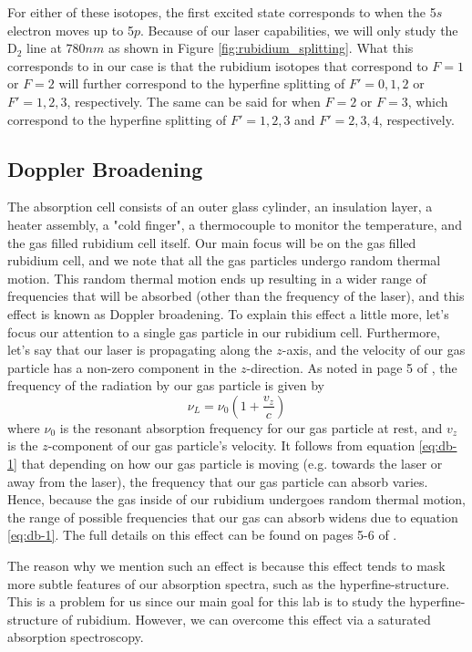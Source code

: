 \documentclass[twocolumn,amsmath,amssymb,pra, floatfix]{revtex4-2}
\begin{document}
For either of these isotopes, the first excited state corresponds to when the 5$s$ electron moves up to 5$p$. Because of our laser capabilities, we will only study the $\mathrm{D}_{2}$ line at $780 \si{nm}$ as shown in Figure \ref{fig:rubidium_splitting}. What this corresponds to in our case is that the rubidium isotopes that correspond to $F = 1$ or $F = 2$ will further correspond to the hyperfine splitting of $F' = 0, 1, 2$ or $F' = 1, 2, 3$, respectively. The same can be said for when $F = 2$ or $F = 3$, which correspond to the hyperfine splitting of $F' = 1, 2, 3$ and $F' = 2, 3, 4$, respectively.

\subsection{Doppler Broadening}
The absorption cell consists of an outer glass cylinder, an insulation layer, a heater assembly, a "cold finger", a thermocouple to monitor the temperature, and the gas filled rubidium cell itself. Our main focus will be on the gas filled rubidium cell, and we note that all the gas particles undergo random thermal motion. This random thermal motion ends up resulting in a wider range of frequencies that will be absorbed (other than the frequency of the laser), and this effect is known as Doppler broadening. To explain this effect a little more, let's focus our attention to a single gas particle in our rubidium cell. Furthermore, let's say that our laser is propagating along the $z$-axis, and the velocity of our gas particle has a non-zero component in the $z$-direction. As noted in page 5 of \cite{gatech}, the frequency of the radiation by our gas particle is given by 
\begin{equation}
    \nu_{L}
    =
    \nu_{0} 
    \left( 1 + \frac{v_{z}}{c} \right)
    \label{eq:db-1}
\end{equation}
where $\nu_{0}$ is the resonant absorption frequency for our gas particle at rest, and $v_{z}$ is the $z$-component of our gas particle's velocity. It follows from equation \ref{eq:db-1} that depending on how our gas particle is moving (e.g. towards the laser or away from the laser), the frequency that our gas particle can absorb varies. Hence, because the gas inside of our rubidium undergoes random thermal motion, the range of possible frequencies that our gas can absorb widens due to equation \ref{eq:db-1}. The full details on this effect can be found on pages 5-6 of \cite{gatech}.

The reason why we mention such an effect is because this effect tends to mask more subtle features of our absorption spectra, such as the hyperfine-structure. This is a problem for us since our main goal for this lab is to study the hyperfine-structure of rubidium. However, we can overcome this effect via a saturated absorption spectroscopy. 
\end{document}
